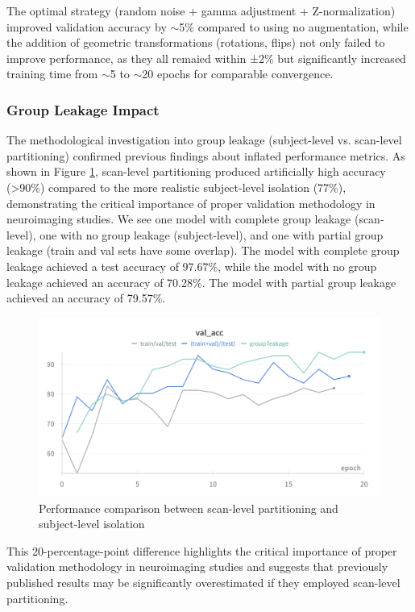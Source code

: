 \documentclass[11pt, a4paper]{article}
\begin{document}
The optimal strategy (random noise + gamma adjustment + Z-normalization) improved validation accuracy by $\sim$5\% compared to using no augmentation, while the addition of geometric transformations (rotations, flips) not only failed to improve performance, as they all remaied within ±2\% but significantly increased training time from $\sim$5 to $\sim$20 epochs for comparable convergence.

\subsubsection{Group Leakage Impact}

The methodological investigation into group leakage (subject-level vs. scan-level partitioning) confirmed previous findings about inflated performance metrics. As shown in Figure \ref{fig:group_leakage}, scan-level partitioning produced artificially high accuracy (>90\%) compared to the more realistic subject-level isolation (77\%), demonstrating the critical importance of proper validation methodology in neuroimaging studies. We see one model with complete group leakage (scan-level), one with no group leakage (subject-level), and one with partial group leakage (train and val sets have some overlap). The model with complete group leakage achieved a test accuracy of 97.67\%, while the model with no group leakage achieved an accuracy of 70.28\%. The model with partial group leakage achieved an accuracy of 79.57\%.

\begin{figure}[htbp]
  \centering
  \includegraphics[width=\textwidth]{figures/leakage.png}
  \caption{Performance comparison between scan-level partitioning and subject-level isolation}
  \label{fig:group_leakage}
\end{figure}

This 20-percentage-point difference highlights the critical importance of proper validation methodology in neuroimaging studies and suggests that previously published results may be significantly overestimated if they employed scan-level partitioning.
\end{document}
